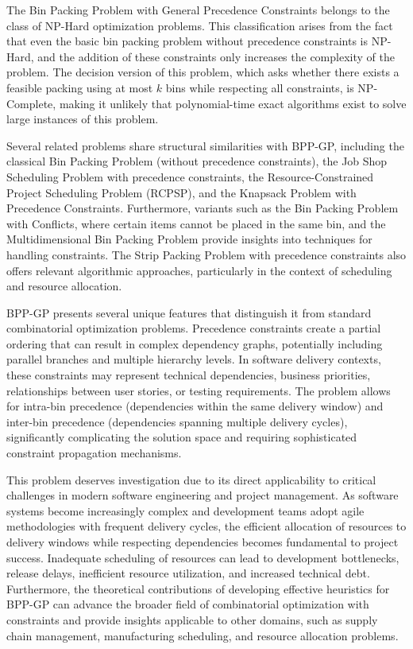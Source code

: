 \documentclass[12pt]{article}
\begin{document}
The Bin Packing Problem with General Precedence Constraints belongs to the class of NP-Hard optimization problems. This classification arises from the fact that even the basic bin packing problem without precedence constraints is NP-Hard, and the addition of these constraints only increases the complexity of the problem. The decision version of this problem, which asks whether there exists a feasible packing using at most $k$ bins while respecting all constraints, is NP-Complete, making it unlikely that polynomial-time exact algorithms exist to solve large instances of this problem.

Several related problems share structural similarities with BPP-GP, including the classical Bin Packing Problem (without precedence constraints), the Job Shop Scheduling Problem with precedence constraints, the Resource-Constrained Project Scheduling Problem (RCPSP), and the Knapsack Problem with Precedence Constraints. Furthermore, variants such as the Bin Packing Problem with Conflicts, where certain items cannot be placed in the same bin, and the Multidimensional Bin Packing Problem provide insights into techniques for handling constraints. The Strip Packing Problem with precedence constraints also offers relevant algorithmic approaches, particularly in the context of scheduling and resource allocation.

BPP-GP presents several unique features that distinguish it from standard combinatorial optimization problems. Precedence constraints create a partial ordering that can result in complex dependency graphs, potentially including parallel branches and multiple hierarchy levels. In software delivery contexts, these constraints may represent technical dependencies, business priorities, relationships between user stories, or testing requirements. The problem allows for intra-bin precedence (dependencies within the same delivery window) and inter-bin precedence (dependencies spanning multiple delivery cycles), significantly complicating the solution space and requiring sophisticated constraint propagation mechanisms.

This problem deserves investigation due to its direct applicability to critical challenges in modern software engineering and project management. As software systems become increasingly complex and development teams adopt agile methodologies with frequent delivery cycles, the efficient allocation of resources to delivery windows while respecting dependencies becomes fundamental to project success. Inadequate scheduling of resources can lead to development bottlenecks, release delays, inefficient resource utilization, and increased technical debt. Furthermore, the theoretical contributions of developing effective heuristics for BPP-GP can advance the broader field of combinatorial optimization with constraints and provide insights applicable to other domains, such as supply chain management, manufacturing scheduling, and resource allocation problems.
\end{document}
